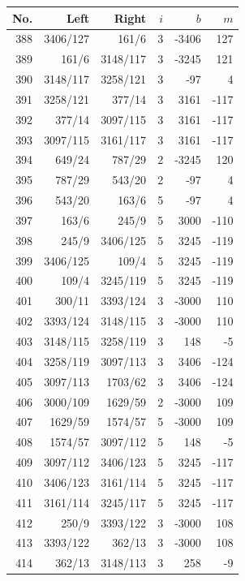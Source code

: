 \documentclass[11pt,a4paper]{article}
\begin{document}
\begin{minipage}[t]{.49\linewidth}\centering\footnotesize\setlength{\tabcolsep}{2pt}\renewcommand{\arraystretch}{1.09}
\begin{tabular*}{\linewidth}{@{}r@{\extracolsep{\fill}}rrrrr@{}}\toprule
No. & Left & Right & $i$ & $b$ & $m$\\\midrule
388 & 3406/127 & 161/6 & 3 & -3406 & 127\\
389 & 161/6 & 3148/117 & 3 & -3245 & 121\\
390 & 3148/117 & 3258/121 & 3 & -97 & 4\\
391 & 3258/121 & 377/14 & 3 & 3161 & -117\\
392 & 377/14 & 3097/115 & 3 & 3161 & -117\\
393 & 3097/115 & 3161/117 & 3 & 3161 & -117\\
394 & 649/24 & 787/29 & 2 & -3245 & 120\\
395 & 787/29 & 543/20 & 2 & -97 & 4\\
396 & 543/20 & 163/6 & 5 & -97 & 4\\
397 & 163/6 & 245/9 & 5 & 3000 & -110\\
398 & 245/9 & 3406/125 & 5 & 3245 & -119\\
399 & 3406/125 & 109/4 & 5 & 3245 & -119\\
400 & 109/4 & 3245/119 & 5 & 3245 & -119\\
401 & 300/11 & 3393/124 & 3 & -3000 & 110\\
402 & 3393/124 & 3148/115 & 3 & -3000 & 110\\
403 & 3148/115 & 3258/119 & 3 & 148 & -5\\
404 & 3258/119 & 3097/113 & 3 & 3406 & -124\\
405 & 3097/113 & 1703/62 & 3 & 3406 & -124\\
406 & 3000/109 & 1629/59 & 2 & -3000 & 109\\
407 & 1629/59 & 1574/57 & 5 & -3000 & 109\\
408 & 1574/57 & 3097/112 & 5 & 148 & -5\\
409 & 3097/112 & 3406/123 & 5 & 3245 & -117\\
410 & 3406/123 & 3161/114 & 5 & 3245 & -117\\
411 & 3161/114 & 3245/117 & 5 & 3245 & -117\\
412 & 250/9 & 3393/122 & 3 & -3000 & 108\\
413 & 3393/122 & 362/13 & 3 & -3000 & 108\\
414 & 362/13 & 3148/113 & 3 & 258 & -9\\

\end{tabular*}
\end{minipage}
\end{document}
